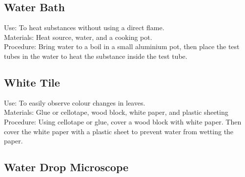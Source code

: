\subsection*{Water Bath}


Use: To heat substances without using a direct flame.\\
Materials: Heat source, water, and a cooking pot.\\
Procedure: Bring water to a boil in a small aluminium pot, then place the test tubes in the water to heat the substance inside the test tube.\\


\subsection*{White Tile}


Use: To easily observe colour changes in leaves.\\
Materials: Glue or cellotape, wood block, white paper, and plastic sheeting\\
Procedure: Using cellotape or glue, cover a wood block with white paper. Then cover the white paper with a plastic sheet to prevent water from wetting the paper.


\subsection*{Water Drop Microscope}


